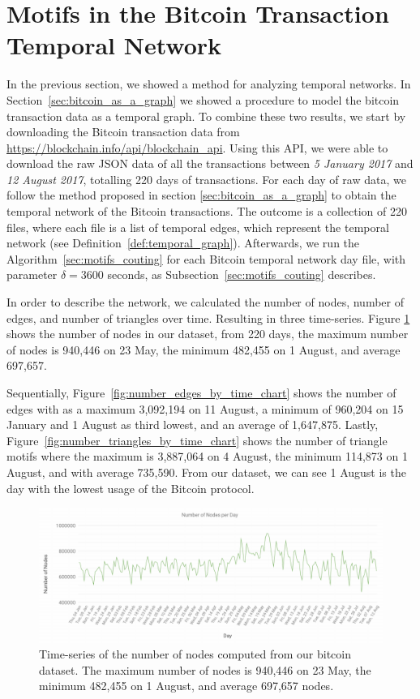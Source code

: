 \documentclass[../../thesis.tex]{subfiles}
\begin{document}
\section{Motifs in the Bitcoin Transaction Temporal Network}
\label{sec:motifs_bitcoin}


In the previous section, we showed a method for analyzing temporal networks. In Section~\ref{sec:bitcoin_as_a_graph} we showed a procedure to model the bitcoin transaction data as a temporal graph. To combine these two results, we start by downloading the Bitcoin transaction data from \url{https://blockchain.info/api/blockchain_api}. Using this API, we were able to download the raw JSON data of all the transactions between \textit{5 January 2017} and \textit{12 August 2017}, totalling 220 days of transactions. For each day of raw data, we follow the method proposed in section \ref{sec:bitcoin_as_a_graph} to obtain the temporal network of the Bitcoin transactions. The outcome is a collection of 220 files, where each file is a list of temporal edges, which represent the temporal network (see Definition~\ref{def:temporal_graph}). Afterwards, we run the Algorithm~\ref{sec:motifs_couting} for each Bitcoin temporal network day file, with parameter $\delta=3600$ seconds, as Subsection~\ref{sec:motifs_couting} describes. 


In order to describe the network, we calculated the number of nodes, number of edges, and number of triangles over time. Resulting in three time-series. Figure \ref{fig:number_nodes_by_time_chart} shows the number of nodes in our dataset, from 220 days, the maximum number of nodes is 940,446 on 23 May, the minimum 482,455 on 1 August, and average 697,657. 
 
 Sequentially, Figure~\ref{fig:number_edges_by_time_chart} shows the number of edges with as a maximum 3,092,194 on 11 August, a minimum of 960,204 on 15 January and 1 August as third lowest, and an average of 1,647,875. Lastly, Figure~\ref{fig:number_triangles_by_time_chart} shows the number of triangle motifs where the maximum is 3,887,064 on 4 August, the minimum 114,873 on 1 August, and with average 735,590. From our dataset, we can see 1 August is the day with the lowest usage of the Bitcoin protocol. 


\begin{figure}[H]
\centering
\includegraphics[width=1\textwidth]{content/unveiling/img/number_nodes_by_time_chart}
\caption{Time-series of the number of nodes computed from our bitcoin dataset. The maximum number of nodes is 940,446 on 23 May, the minimum 482,455 on 1 August, and average 697,657 nodes.}
\label{fig:number_nodes_by_time_chart}
\end{figure}
\end{document}
